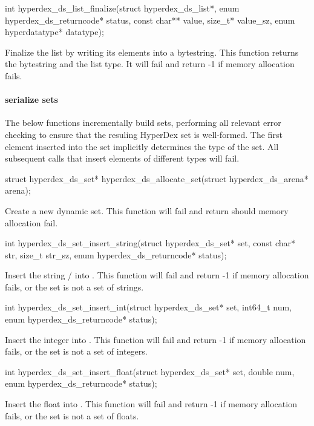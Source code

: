 \begin{ccode}
int hyperdex_ds_list_finalize(struct hyperdex_ds_list*,
                              enum hyperdex_ds_returncode* status,
                              const char** value, size_t* value_sz,
                              enum hyperdatatype* datatype);
\end{ccode}
Finalize the list by writing its elements into a bytestring.  This
function returns the bytestring and the list type.  It will fail and return -1
if memory allocation fails.

\paragraph{serialize sets}

The below functions incrementally build sets, performing all relevant error
checking to ensure that the resuling HyperDex set is well-formed.  The first
element inserted into the set implicitly determines the type of the set.  All
subsequent calls that insert elements of different types will fail.

\begin{ccode}
struct hyperdex_ds_set* hyperdex_ds_allocate_set(struct hyperdex_ds_arena* arena);
\end{ccode}
Create a new dynamic set.  This function will fail and return
 should memory allocation fail.

\begin{ccode}
int hyperdex_ds_set_insert_string(struct hyperdex_ds_set* set,
                                  const char* str, size_t str_sz,
                                  enum hyperdex_ds_returncode* status);
\end{ccode}
Insert the string / into .  This
function will fail and return -1 if memory allocation fails, or the set is not a
set of strings.

\begin{ccode}
int hyperdex_ds_set_insert_int(struct hyperdex_ds_set* set, int64_t num,
                               enum hyperdex_ds_returncode* status);
\end{ccode}
Insert the integer  into .  This function will
fail and return -1 if memory allocation fails, or the set is not a set of
integers.

\begin{ccode}
int hyperdex_ds_set_insert_float(struct hyperdex_ds_set* set, double num,
                                 enum hyperdex_ds_returncode* status);
\end{ccode}
Insert the float  into .  This function will fail
and return -1 if memory allocation fails, or the set is not a set of floats.

